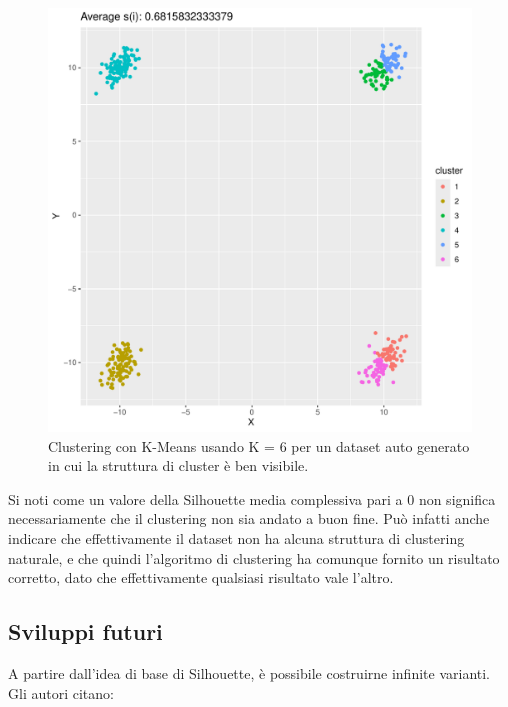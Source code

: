 \documentclass[italian]{article}
\begin{document}
			\begin{figure}[h]
				\includegraphics[width = \textwidth]{doc/clusters-6.pdf}
				\caption{Clustering con K-Means usando K = 6 per un dataset
				auto generato in cui la struttura di cluster è ben visibile. }
				\label{fig:c6}
			\end{figure}

			Si noti come un valore della Silhouette media complessiva
			pari a $0$ non significa necessariamente che il clustering
			non sia andato a buon fine. Può infatti anche indicare che
			effettivamente il dataset non ha alcuna struttura di clustering
			naturale, e che quindi l'algoritmo di clustering ha comunque
			fornito un risultato corretto, dato che effettivamente qualsiasi
			risultato vale l'altro.

		\subsection{Sviluppi futuri}

			A partire dall'idea di base di Silhouette, è possibile costruirne
			infinite varianti. Gli autori citano:
\end{document}
